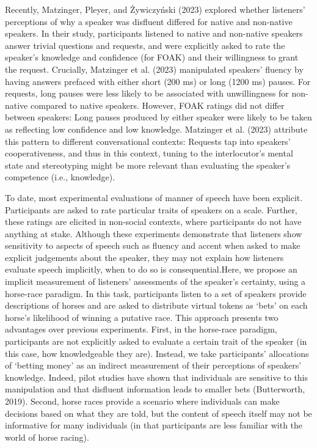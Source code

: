 \documentclass[
  man,floatsintext]{apa7}
\begin{document}
Recently, Matzinger, Pleyer, and Żywiczyński (2023) explored whether listeners' perceptions of why a speaker was disfluent differed for native and non-native speakers. In their study, participants listened to native and non-native speakers answer trivial questions and requests, and were explicitly asked to rate the speaker's knowledge and confidence (for FOAK) and their willingness to grant the request. Crucially, Matzinger et al. (2023) manipulated speakers' fluency by having answers prefaced with either short (200 ms) or long (1200 ms) pauses. For requests, long pauses were less likely to be associated with unwillingness for non-native compared to native speakers. However, FOAK ratings did not differ between speakers: Long pauses produced by either speaker were likely to be taken as reflecting low confidence and low knowledge. Matzinger et al. (2023) attribute this pattern to different conversational contexts: Requests tap into speakers' cooperativeness, and thus in this context, tuning to the interlocutor's mental state and stereotyping might be more relevant than evaluating the speaker's competence (i.e., knowledge).

To date, most experimental evaluations of manner of speech have been explicit. Participants are asked to rate particular traits of speakers on a scale. Further, these ratings are elicited in non-social contexts, where participants do not have anything at stake. Although these experiments demonstrate that listeners show sensitivity to aspects of speech such as fluency and accent when asked to make explicit judgements about the speaker, they may not explain how listeners evaluate speech implicitly, when to do so is consequential.Here, we propose an implicit measurement of listeners' assessments of the speaker's certainty, using a horse-race paradigm. In this task, participants listen to a set of speakers provide descriptions of horses and are asked to distribute virtual tokens as `bets' on each horse's likelihood of winning a putative race. This approach presents two advantages over previous experiments. First, in the horse-race paradigm, participants are not explicitly asked to evaluate a certain trait of the speaker (in this case, how knowledgeable they are). Instead, we take participants' allocations of `betting money' as an indirect measurement of their perceptions of speakers' knowledge. Indeed, pilot studies have shown that individuals are sensitive to this manipulation and that disfluent information leads to smaller bets (Butterworth, 2019). Second, horse races provide a scenario where individuals can make decisions based on what they are told, but the content of speech itself may not be informative for many individuals (in that participants are less familiar with the world of horse racing).
\end{document}
